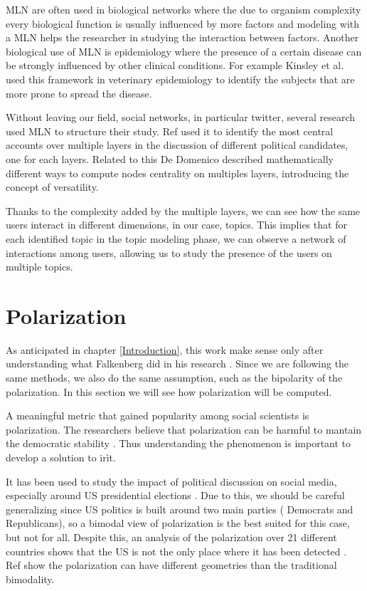 MLN are often used in biological networks where the due to organism complexity every biological function is usually influenced by more factors and modeling with a MLN helps the researcher in studying the interaction between factors. Another biological use of MLN is epidemiology where the presence of a certain disease can be strongly influenced by other clinical conditions. For example Kinsley et al. \cite{kinsley_multilayer_2020} used this framework in veterinary epidemiology to identify the subjects that are more prone to spread the disease.

Without leaving our field, social networks, in particular twitter,  several research used MLN to structure their study.  Ref \cite{nguyen_twitter_21} used it to identify the most central accounts over multiple layers in the discussion of different political candidates, one for each layers. Related to this De Domenico \cite{de_domenico_ranking_2015} described mathematically different ways to compute nodes centrality on multiples layers, introducing the concept of versatility. 




Thanks to the complexity added by the multiple layers, we can see how the same users interact in different dimensions, in our case, topics. This implies that for each identified topic in the topic modeling phase, we can observe a network of interactions among users, allowing us to study the presence of the users on multiple topics.




\section[Polarization]{Polarization}
As anticipated in chapter \ref{Introduction}, this work make sense only after understanding what Falkenberg did in his research \cite{falkenberg_growing_2022}. Since we are following the same methods, we also do the same assumption, such as the bipolarity of the polarization. In this section we will see how polarization will be computed.

A meaningful metric that gained popularity among social scientists is polarization. The researchers believe that polarization can be harmful to mantain the democratic stability \cite{mccoy_polarization_democracy_2018}. Thus understanding the phenomenon is important to develop a solution to irìt.

It has been used to study the impact of political discussion on social media, especially around US presidential elections \cite{conover_political_2011}
\cite{flamino_shifting_2021} . Due to this, we should be careful generalizing since US politics is built around two main parties ( Democrats and Republicans), so a bimodal view of polarization is the best suited for this case, but not for all. Despite this, an analysis of the polarization over 21 different countries shows that the US is not the only place where it has been detected  \cite{gidron_toward_2019}. Ref
\cite{radicioni_networked_2021}
show the polarization can have different geometries than the traditional bimodality.


